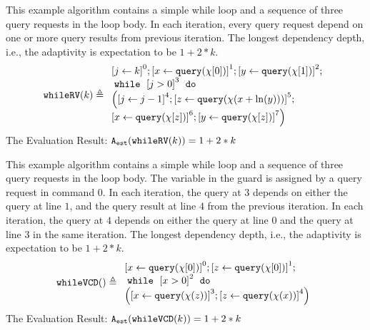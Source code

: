             \begin{example}
   \label{ex:whileRV}
   This example algorithm contains a simple while loop
    and a sequence of three query requests in the loop body.
In each iteration, every query request depend on one or more
query results from previous iteration.
The longest dependency depth, i.e., the adaptivity is expectation to be $1 +2 * k$.
   \[
   \kw{whileRV}(k) \triangleq 
   \begin{array}{l}
   \clabel{\assign{j}{k} }^{0} ; 
   \clabel{ \assign{x}{\query(\chi[0])}}^{1} ; 
\clabel{ \assign{y}{\query(\chi[1])}}^{2} ; \\
    \ewhile ~ \clabel{j > 0}^{3} ~ \edo ~ \\
    \Big(
     \clabel{\assign{j}{j-1}}^{4} ;
     \clabel{\assign{z}{\query(\chi(x + \ln(y)))} }^{5}  ; 
     \\
     \clabel{ \assign{x}{\query(\chi[z])}}^{6} ; 
     \clabel{ \assign{y}{\query(\chi[z])}}^{7} 
    \Big)
\end{array}
   \]
   The Evaluation Result: $ {\mathtt{A_{est}}}(\mathtt{whileRV}(k)) = 1 + 2 * k $
            \end{example}
   \begin{example}
\label{ex:whileVCD}
%
This example algorithm contains a simple while loop
and a sequence of three query requests in the loop body.
The variable in the guard is assigned by a query request in command $0$.
In each iteration, the query at $3$ depends on either the query at line $1$, and the query result at line $4$ from the previous iteration.
In each iteration, the query at $4$ depends on either the query at line $0$ and the query at line $3$ in the same iteration.
The longest dependency depth, i.e., the adaptivity is expectation to be $1 +2 * k$.
\[
\kw{whileVCD}() \triangleq
\begin{array}{l}
    \clabel{ \assign{x}{\query(\chi[0])} }^{0} ; 
    \clabel{ \assign{z}{\query(\chi[0])} }^{1} ; \\
        \ewhile ~ \clabel{x > 0}^{2} ~ \edo ~ \\
        \Big(
        \clabel{\assign{x}{\query(\chi(z))} }^{3}  ; 
        \clabel{\assign{z}{\query(\chi(x))}}^{4}
      \Big)
    \end{array}
\]
The Evaluation Result: $ {\mathtt{A_{est}}}(\mathtt{whileVCD}(k)) = 1 + 2 * k $
   \end{example}
